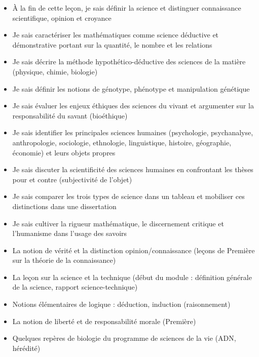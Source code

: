 \documentclass[11pt]{article}
\begin{document}
\begin{objectifs}
\begin{itemize}
\item À la fin de cette leçon, je sais définir la science et distinguer connaissance scientifique, opinion et croyance
\item Je sais caractériser les mathématiques comme science déductive et démonstrative portant sur la quantité, le nombre et les relations
\item Je sais décrire la méthode hypothético-déductive des sciences de la matière (physique, chimie, biologie)
\item Je sais définir les notions de génotype, phénotype et manipulation génétique
\item Je sais évaluer les enjeux éthiques des sciences du vivant et argumenter sur la responsabilité du savant (bioéthique)
\item Je sais identifier les principales sciences humaines (psychologie, psychanalyse, anthropologie, sociologie, ethnologie, linguistique, histoire, géographie, économie) et leurs objets propres
\item Je sais discuter la scientificité des sciences humaines en confrontant les thèses pour et contre (subjectivité de l'objet)
\item Je sais comparer les trois types de science dans un tableau et mobiliser ces distinctions dans une dissertation
\item Je sais cultiver la rigueur mathématique, le discernement critique et l'humanisme dans l'usage des savoirs
\end{itemize}
\end{objectifs}

\begin{prerequis}
\begin{itemize}
\item La notion de vérité et la distinction opinion/connaissance (leçons de Première sur la théorie de la connaissance)
\item La leçon sur la science et la technique (début du module : définition générale de la science, rapport science-technique)
\item Notions élémentaires de logique : déduction, induction (raisonnement)
\item La notion de liberté et de responsabilité morale (Première)
\item Quelques repères de biologie du programme de sciences de la vie (ADN, hérédité)
\end{itemize}
\end{prerequis}
\end{document}

